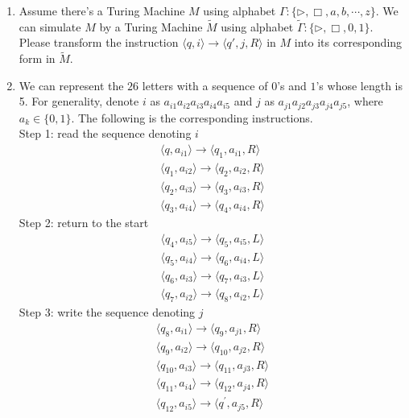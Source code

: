 \documentclass[12pt,a4paper]{article}
\makeatletter
\newtheorem*{solution}{Solution}
\theoremstyle{definition}
\renewenvironment{solution}[1][Solution] {\par\pushQED{\qed}\normalfont\topsep6\p@\@plus6\p@\relax\trivlist\item[\hskip\labelsep\bfseries#1\@addpunct{.}]\ignorespaces}{\popQED\endtrivlist\@endpefalse} \makeatother
\makeatother
\begin{document}
\begin{enumerate}
\item Assume there's a Turing Machine $M$ using alphabet $\Gamma :\{ \triangleright, \Box, a, b, \cdots, z\}$. We can simulate $M$ by a Turing Machine $\tilde{M}$ using alphabet $\tilde{\Gamma }:\{ \triangleright, \Box, 0, 1\}$. Please transform the instruction $\langle q, i \rangle \rightarrow \langle q',j, R\rangle$ in $M$ into its corresponding form in $\tilde{M}$.
\begin{solution}
	We can represent the $26$ letters with a sequence of $0$'s and $1$'s whose length is 5. For generality, denote $i$ as $a_{i1}a_{i2}a_{i3}a_{i4}a_{i5}$ and $j$ as $a_{j1}a_{j2}a_{j3}a_{j4}a_{j5}$, where $a_k \in \{0, 1\}$. The following is the corresponding instructions. \\
	Step 1: read the sequence denoting $i$
	\begin{gather*}
		\langle q, a_{i1} \rangle \rightarrow \langle q_1, a_{i1},  R\rangle \\
		\langle q_1, a_{i2} \rangle \rightarrow \langle q_2, a_{i2},  R\rangle \\
		\langle q_2, a_{i3} \rangle \rightarrow \langle q_3, a_{i3},  R\rangle \\
		\langle q_3, a_{i4} \rangle \rightarrow \langle q_4, a_{i4},  R\rangle
	\end{gather*}
	Step 2: return to the start
	\begin{gather*}
		\langle q_4, a_{i5} \rangle \rightarrow \langle q_5, a_{i5},  L\rangle \\
		\langle q_5, a_{i4} \rangle \rightarrow \langle q_6, a_{i4},  L\rangle \\
		\langle q_6, a_{i3} \rangle \rightarrow \langle q_7, a_{i3},  L\rangle \\
		\langle q_7, a_{i2} \rangle \rightarrow \langle q_8, a_{i2},  L\rangle 
	\end{gather*}
	Step 3: write the sequence denoting $j$
	\begin{gather*}
		\langle q_8, a_{i1} \rangle \rightarrow \langle q_9, a_{j1},  R\rangle \\
		\langle q_9, a_{i2} \rangle \rightarrow \langle q_{10}, a_{j2},  R\rangle \\
		\langle q_{10}, a_{i3} \rangle \rightarrow \langle q_{11}, a_{j3},  R\rangle \\
		\langle q_{11}, a_{i4} \rangle \rightarrow \langle q_{12}, a_{j4},  R\rangle \\
		\langle q_{12}, a_{i5} \rangle \rightarrow \langle q^{\prime}, a_{j5},  R\rangle
	\end{gather*}
\end{solution}


\end{enumerate}
\end{document}
